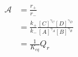 \begin{eqnarray}\label{eqn:reaction-affinity-ratio}
\mathcal{A} &= \frac{r_+}{r_-} \\
& = \frac{k_+}{k_-}\frac{[C]^{\gamma_C}[D]^{\gamma_D}}{[A]^{\gamma_A}[B]^{\gamma_B}} \\
& = \frac{1}{K_{eq}}{Q_r} \\
\end{eqnarray}